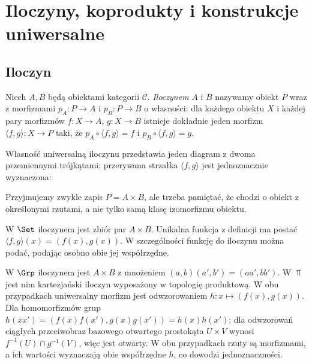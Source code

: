 \providecommand{\atlasref}[2]{#2}
\section{Iloczyny, koprodukty i konstrukcje uniwersalne}\label{sec:produkty}

\subsection{Iloczyn}

\begin{definicja}\label{def:produkt}
Niech $A,B$ będą obiektami kategorii $\mathcal C$. \emph{Iloczynem} $A$ i $B$ nazywamy obiekt $P$ wraz z morfizmami $p_A:P\to A$ i $p_B:P\to B$ o własności: dla każdego obiektu $X$ i każdej pary morfizmów $f:X\to A$, $g:X\to B$ istnieje dokładnie jeden morfizm $\langle f,g\rangle:X\to P$ taki, że $p_A\circ\langle f,g\rangle=f$ i $p_B\circ\langle f,g\rangle=g$.
\end{definicja}

Własność uniwersalną iloczynu przedstawia jeden diagram z dwoma przemiennymi trójkątami; przerywana strzałka $\langle f,g\rangle$ jest jednoznacznie wyznaczona:
\begin{center}
\end{center}
Przyjmujemy zwykle zapis $P=A\times B$, ale trzeba pamiętać, że chodzi o obiekt z określonymi rzutami, a nie tylko samą klasę izomorfizmu obiektu.

\begin{przyklad}[Zbiory]
W $\Set$ iloczynem jest zbiór par $A\times B$. Unikalna funkcja z definicji ma postać $\langle f,g\rangle(x)=(f(x),g(x))$. W szczególności funkcję do iloczynu można podać, podając osobno obie jej współrzędne.
\end{przyklad}

\begin{przyklad}
W $\Grp$ iloczynem jest $A\times B$ z mnożeniem $(a,b)(a',b')=(aa',bb')$. W $\Top$ jest nim kartezjański iloczyn wyposażony w topologię produktową. W obu przypadkach uniwersalny morfizm jest odwzorowaniem $h:x\mapsto(f(x),g(x))$. Dla homomorfizmów grup $h(xx')=(f(x)f(x'),g(x)g(x'))=h(x)h(x')$; dla odwzorowań ciągłych przeciwobraz bazowego otwartego prostokąta $U\times V$ wynosi $f^{-1}(U)\cap g^{-1}(V)$, więc jest otwarty. W obu przypadkach rzuty są morfizmami, a ich wartości wyznaczają obie współrzędne $h$, co dowodzi jednoznaczności.
\end{przyklad}

